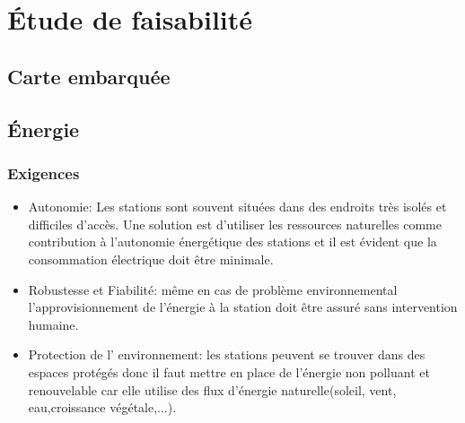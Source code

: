 \section{Étude de faisabilité}

\subsection{Carte embarquée}

\subsection{Énergie}

\subsubsection{Exigences}
\begin{itemize}

\item Autonomie: Les stations sont souvent situées dans des endroits très isolés et difficiles d'accès. Une solution est d'utiliser les ressources naturelles comme contribution à l'autonomie énergétique des stations et il est évident que la consommation électrique doit être minimale.

\smallskip \item Robustesse et Fiabilité: même en cas de problème environnemental l'approvisionnement de l'énergie à la station doit être assuré sans intervention humaine.

\smallskip \item Protection de l' environnement: les stations peuvent se trouver dans des espaces prot\'{e}g\'{e}s donc il faut mettre en place de l'\'{e}nergie non polluant et renouvelable car elle utilise des flux d'\'{e}nergie naturelle(soleil, vent, eau,croissance v\'{e}g\'{e}tale,...).
\end{itemize}

